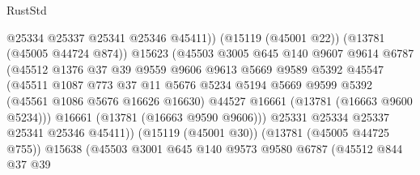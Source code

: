 \begin{lexlean}{RustStd}
\begin{coremodule}
                                  @25334
                                  @25337
                                  @25341
                                  @25346
                                  @45411))
                              (@15119 (@45001 @22))
                              (@13781 (@45005 @44724 @874))
                              @15623
                              (@45503
                                @3005
                                @645
                                @140
                                @9607
                                @9614
                                @6787
                                (@45512
                                  @1376
                                  @37
                                  @39
                                  @9559
                                  @9606
                                  @9613
                                  @5669
                                  @9589
                                  @5392
                                  @45547
                                  (@45511
                                    @1087
                                    @773
                                    @37
                                    @11
                                    @5676
                                    @5234
                                    @5194
                                    @5669
                                    @9599
                                    @5392
                                    (@45561 @1086 @5676 @16626 @16630)
                                    @44527
                                    @16661
                                    (@13781 (@16663 @9600 @5234)))
                                  @16661
                                  (@13781 (@16663 @9590 @9606)))
                                @25331
                                @25334
                                @25337
                                @25341
                                @25346
                                @45411))
                            (@15119 (@45001 @30))
                            (@13781 (@45005 @44725 @755))
                            @15638
                            (@45503
                              @3001
                              @645
                              @140
                              @9573
                              @9580
                              @6787
                              (@45512
                                @844
                                @37
                                @39

\end{coremodule}
\end{lexlean}
